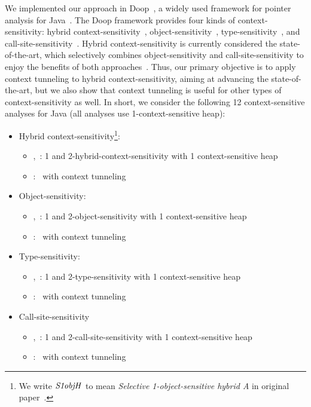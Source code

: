We implemented our approach in Doop~\cite{Bravenboer2009},
a widely used framework for pointer analysis for Java~\cite{TanLX16,
  KastrinisS13a, Smaragdakis2011, JeJeChOh17,Tan2017}.
The Doop framework provides four kinds of context-sensitivity:
hybrid context-sensitivity~\cite{KastrinisS13a}, object-sensitivity~\cite{Milanova2002,Milanova2005}, type-sensitivity~\cite{Smaragdakis2011}, and call-site-sensitivity~\cite{Smaragdakis2015}.
Hybrid context-sensitivity is currently considered the state-of-the-art, which
selectively combines object-sensitivity and call-site-sensitivity to
enjoy the benefits of both approaches~\cite{KastrinisS13a}.
Thus, our primary objective is to apply context tunneling to hybrid
context-sensitivity, aiming at advancing the state-of-the-art,
but we also show that context tunneling is useful for
other types of context-sensitivity as well.
In short, we consider the
following 12 context-sensitive analyses for Java (all analyses use
1-context-sensitive heap):
\begin{itemize}
	\item Hybrid context-sensitivity\footnote{We write ${\it S1objH}$ to mean {\it Selective 1-object-sensitive hybrid A} in original paper~\cite{KastrinisS13a}.}:
	\begin{itemize}
		\item \onesobjH,~\twosobjH: 1 and
                  2-hybrid-context-sensitivity with 1
                  context-sensitive heap
		\item \onesobjHT: \onesobjH~with context tunneling
	\end{itemize}
	\item Object-sensitivity:
	\begin{itemize}
		\item \oneobjH,~\twoobjH: 1 and 2-object-sensitivity  with 1
                  context-sensitive heap
		\item \oneobjHT: \oneobjH~with context tunneling
	\end{itemize}
	\item Type-sensitivity:
	\begin{itemize}
		\item \onetypeH,~\twotypeH: 1 and 2-type-sensitivity  with 1
                  context-sensitive heap
		\item \onetypeHT: \onetypeH~with context tunneling
	\end{itemize}
	\item Call-site-sensitivity
	\begin{itemize}
		\item \onecallH,~\twocallH: 1 and
                  2-call-site-sensitivity  with 1
                  context-sensitive heap
		\item \onecallHT: \onecallH~with context tunneling
	\end{itemize}
\end{itemize}

